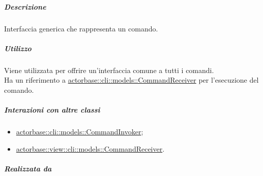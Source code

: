 \documentclass{scalatekids-article}
\begin{document}
\subparagraph{Descrizione}

Interfaccia generica che rappresenta un comando.

\subparagraph{Utilizzo}

Viene utilizzata per offrire un'interfaccia comune a tutti i comandi.\\Ha un
riferimento a \hyperref[sec:actorbase::cli::models::CommandReceiver]{actorbase::cli::models::CommandReceiver} per l'esecuzione del
comando.

\subparagraph{Interazioni con altre classi}

\begin{itemize}
\item \hyperref[sec:actorbase::cli::models::CommandInvoker]{actorbase::cli::models::CommandInvoker};
\item \hyperref[sec:actorbase::view::cli::models::CommandReceiver]{actorbase::view::cli::models::CommandReceiver}.
\end{itemize}

\subparagraph{Realizzata da}
\end{document}
